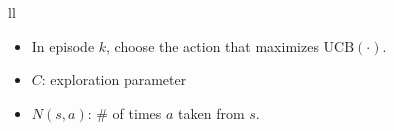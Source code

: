 \begin{notes}
\begin{center}
\begin{tabular}{ll}
            {
                \begin{itemize}
                    \item In episode $k$, choose the action that maximizes $\text{UCB}(\cdot)$.
                    \item $C$: exploration parameter
                    \item $N(s,a)$: \# of times $a$ taken from $s$. 
                \end{itemize}
            } \\
            \bottomrule
        \end{tabular}
    \end{center}
\end{notes}